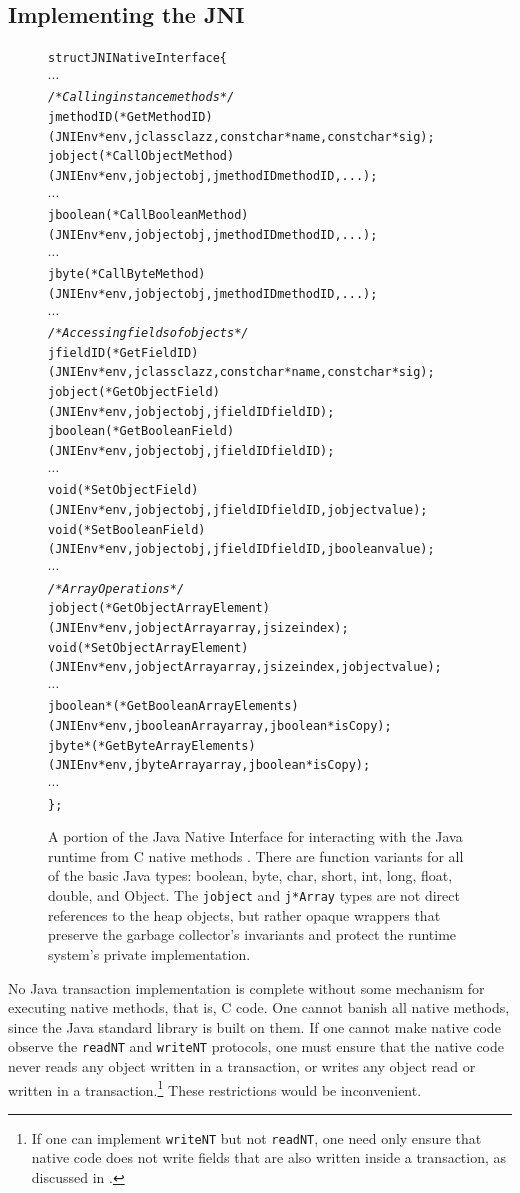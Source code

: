 \subsection{Implementing the JNI}
\begin{figure}\sis\fontsize{9}{10}\begin{alltt}
struct JNINativeInterface \{
  \(\cdots\)
  \textit{/* Calling instance methods */}
  jmethodID (*GetMethodID)
    (JNIEnv *env, jclass clazz, const char *name, const char *sig);
  jobject (*CallObjectMethod)
    (JNIEnv *env, jobject obj, jmethodID methodID, ...);
  \(\cdots\)
  jboolean (*CallBooleanMethod)
    (JNIEnv *env, jobject obj, jmethodID methodID, ...);
  \(\cdots\)
  jbyte (*CallByteMethod)
    (JNIEnv *env, jobject obj, jmethodID methodID, ...);
  \(\cdots\)
  \textit{/* Accessing fields of objects */}
  jfieldID (*GetFieldID)
    (JNIEnv *env, jclass clazz, const char *name, const char *sig);
  jobject (*GetObjectField)
    (JNIEnv *env, jobject obj, jfieldID fieldID);
  jboolean (*GetBooleanField)
    (JNIEnv *env, jobject obj, jfieldID fieldID);
  \(\cdots\)
  void (*SetObjectField)
    (JNIEnv *env, jobject obj, jfieldID fieldID, jobject value);
  void (*SetBooleanField)
    (JNIEnv *env, jobject obj, jfieldID fieldID, jboolean value);
  \(\cdots\)
  \textit{/* Array Operations */}
  jobject (*GetObjectArrayElement)
    (JNIEnv *env, jobjectArray array, jsize index);
  void (*SetObjectArrayElement)
    (JNIEnv *env, jobjectArray array, jsize index, jobject value);
  \(\cdots\)
  jboolean* (*GetBooleanArrayElements)
    (JNIEnv *env, jbooleanArray array, jboolean *isCopy);
  jbyte* (*GetByteArrayElements)
    (JNIEnv *env, jbyteArray array, jboolean *isCopy);
  \(\cdots\)
\};
\end{alltt}
\caption[A portion of the Java Native Interface] {A portion of the
  Java Native Interface for interacting with the Java runtime from C
  native methods \cite{JNI}.  There are function variants for all of the
  basic Java types: boolean, byte, char, short, int, long, float,
  double, and Object.  The \texttt{jobject} and
  \texttt{j*Array} types are not direct references to the heap
  objects, but rather opaque wrappers that preserve the garbage
  collector's invariants and protect the runtime system's private
  implementation.}
\label{fig:jni}
\end{figure}

No Java transaction implementation is complete without some mechanism
for executing native methods, that is, C code.  One cannot banish all
native methods, since the Java standard library is built on them. 
If one cannot make native code observe the \texttt{readNT} and
\texttt{writeNT} protocols, one must ensure that the native code never
reads any object written in a transaction, or writes any object read
or written in a transaction.\footnote{If one
  can implement \texttt{writeNT} but not \texttt{readNT}, one need
  only ensure that native code does not write fields that are also
  written inside a transaction, as discussed in .}
These restrictions would be inconvenient.

